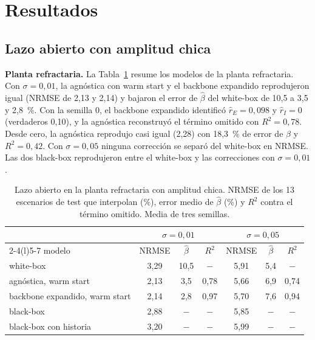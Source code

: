 \documentclass[11pt,a4paper]{article}
\newcommand{\bh}{\hat\beta}
\begin{document}
\section{Resultados}

\subsection{Lazo abierto con amplitud chica}

\textbf{Planta refractaria.} La Tabla~\ref{tab:refrac_chica} resume los modelos de la planta refractaria. Con $\sigma = 0{,}01$, la agnóstica con warm start y el backbone expandido reprodujeron igual (NRMSE de 2,13 y 2,14) y bajaron el error de $\bh$ del white-box de 10,5 a 3,5 y 2,8~\%. Con la semilla 0, el backbone expandido identificó $\hat r_E = 0{,}098$ y $\hat r_I = 0$ (verdaderos 0,10), y la agnóstica reconstruyó el término omitido con $R^2 = 0{,}78$. Desde cero, la agnóstica reprodujo casi igual (2,28) con 18,3~\% de error de $\bh$ y $R^2 = 0{,}42$. Con $\sigma = 0{,}05$ ninguna corrección se separó del white-box en NRMSE. Las dos black-box reprodujeron entre el white-box y las correcciones con $\sigma = 0{,}01$.

\begin{table}[H]
\centering
\small
\caption{Lazo abierto en la planta refractaria con amplitud chica. NRMSE de los 13 escenarios de test que interpolan (\%), error medio de $\bh$ (\%) y $R^2$ contra el término omitido. Media de tres semillas.}
\label{tab:refrac_chica}
\begin{tabular}{@{}lcccccc@{}}
\toprule
& \multicolumn{3}{c}{$\sigma = 0{,}01$} & \multicolumn{3}{c}{$\sigma = 0{,}05$} \\
\cmidrule(lr){2-4}\cmidrule(l){5-7}
modelo & NRMSE & $\bh$ & $R^2$ & NRMSE & $\bh$ & $R^2$ \\
\midrule
white-box & 3,29 & 10,5 & $-$ & 5,91 & 5,4 & $-$ \\
agnóstica, warm start & 2,13 & 3,5 & 0,78 & 5,66 & 6,9 & 0,74 \\
backbone expandido, warm start & 2,14 & 2,8 & 0,97 & 5,70 & 7,6 & 0,94 \\
black-box & 2,88 & $-$ & $-$ & 5,85 & $-$ & $-$ \\
black-box con historia & 3,20 & $-$ & $-$ & 5,99 & $-$ & $-$ \\
\bottomrule
\end{tabular}
\end{table}
\end{document}

